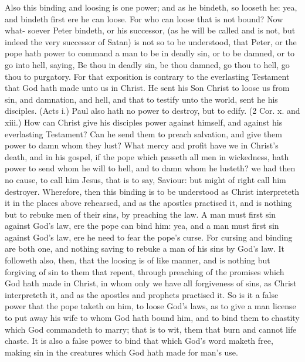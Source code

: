 \documentclass{custom}
\begin{document}
Also this binding and loosing is one power; and as he 
bindeth, so looseth he: yea, and bindeth first ere he can 
loose. For who can loose that is not bound? Now what- 
soever Peter bindeth, or his successor, (as he will be called 
and is not, but indeed the very successor of Satan) is not 
so to be understood, that Peter, or the pope hath power 
to command a man to be in deadly sin, or to be damned, 
or to go into hell, saying, Be thou in deadly sin, be thou 
damned, go thou to hell, go thou to purgatory. For that 
exposition is contrary to the everlasting Testament that 
God hath made unto us in Christ. He sent his Son Christ 
to loose us from sin, and damnation, and hell, and that to 
testify unto the world, sent he his disciples. (Acts i.) Paul 
also hath no power to destroy, but to edify. (2 Cor. x. 
and xiii.) How can Christ give his disciples power against 
himself, and against his everlasting Testament? Can he 
send them to preach salvation, and give them power to 
damn whom they lust? What mercy and profit have we in 
Christ's death, and in his gospel, if the pope which passeth 
all men in wickedness, hath power to send whom he will 
to hell, and to damn whom he lusteth? we had then no 
cause, to call him Jesus, that is to say, Saviour: but 
might of right call him destroyer. Wherefore, then this 
binding is to be understood as Christ interpreteth it in the
places above rehearsed, and as the apostles practised it,
and is nothing but to rebuke men of their sins, by preaching 
the law. A man must first sin against God's law, ere the 
pope can bind him: yea, and a man must first sin against 
God's law, ere he need to fear the pope's curse. For 
cursing and binding are both one, and nothing saving to 
rebuke a man of his sins by God's law. It followeth 
also, then, that the loosing is of like manner, and is nothing 
but forgiving of sin to them that repent, through preaching 
of the promises which God hath made in Christ, in whom 
only we have all forgiveness of sins, as Christ interpreteth 
it, and as the apostles and prophets practised it. So is it 
a false power that the pope taketh on him, to loose God's 
laws, as to give a man license to put away his wife to 
whom God hath bound him, and to bind them to chastity 
which God commandeth to marry; that is to wit, them 
that burn and cannot life chaste. It is also a false power 
to bind that which God's word maketh free, making sin 
in the creatures which God hath made for man's use. 
\end{document}
